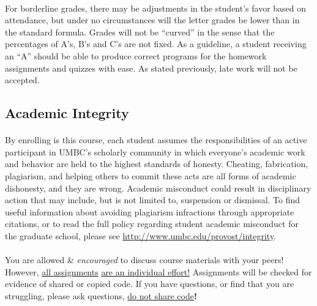 \documentclass[letter,11pt]{article}
\begin{document}
\paragraph{}For borderline grades, there may be adjustments in the student's favor based on attendance, but under no circumstances will the letter grades be lower than in the standard formula. Grades will not be ``curved'' in the sense that the percentages of A's, B's and C's are not fixed. As a guideline, a student receiving an ``A'' should be able to produce correct programs for the homework assignments and quizzes with ease. As stated previously, late work will not be accepted.

\subsection*{Academic Integrity}
\paragraph{}By enrolling is this course, each student assumes the responsibilities of an active participant in UMBC's scholarly community in which everyone's academic work and behavior are held to the highest standards of honesty. Cheating, fabrication, plagiarism, and helping others to commit these acts are all forms of academic dishonesty, and they are wrong. Academic misconduct could result in disciplinary action that may include, but is not limited to, suspension or dismissal. To find useful information about avoiding plagiarism infractions through appropriate citations, or to read the full policy regarding student academic misconduct for the graduate school, please see \url{http://www.umbc.edu/provost/integrity}.

\paragraph{}You are allowed \& \textit{encouraged} to discuss course materials with your peers! However, \underline{all assignments} \underline{are an individual effort!} Assignments will be checked for evidence of shared or copied code. If you have questions, or find that you are struggling, please ask questions, \underline{do not share code}\textbf{!}
\end{document}
